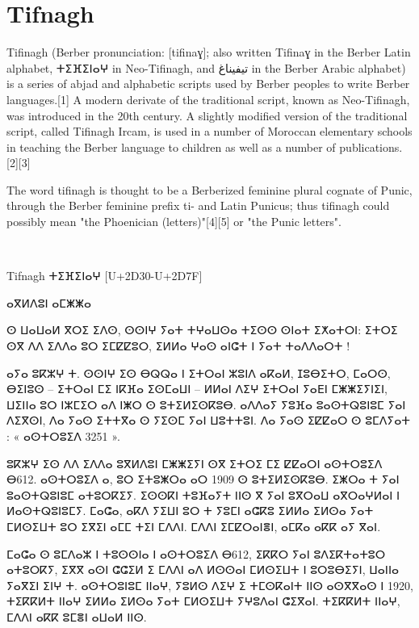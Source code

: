 \section{Tifnagh}

\newfontfamily{}

Tifinagh (Berber pronunciation: [tifinaɣ]; also written Tifinaɣ in the Berber Latin alphabet, {\tifinagh  ⵜⵉⴼⵉⵏⴰⵖ} in Neo-Tifinagh, and تيفيناغ in the Berber Arabic alphabet) is a series of abjad and alphabetic scripts used by Berber peoples to write Berber languages.[1]
A modern derivate of the traditional script, known as Neo-Tifinagh, was introduced in the 20th century. A slightly modified version of the traditional script, called Tifinagh Ircam, is used in a number of Moroccan elementary schools in teaching the Berber language to children as well as a number of publications.[2][3]

The word tifinagh is thought to be a Berberized feminine plural cognate of Punic, through the Berber feminine prefix ti- and Latin Punicus; thus tifinagh could possibly mean "the Phoenician (letters)"[4][5] or "the Punic letters".

\bgroup

\noindent\tifinagh
\colorbox{graphicbackground}{\color{black}^^A
\begin{minipage}{\textwidth}
\parindent1pt
\vskip10pt
 \rightskip\leftskip
Tifnagh     ⵜⵉⴼⵉⵏⴰⵖ [U+2D30-U+2D7F]

ⴰⴳⵍⴷⵓⵏ ⴰⵎⵥⵥⴰ

ⵙ ⵡⴰⵡⴰⵍ ⴳⵔⵉ ⵉⴷⵙ, ⵙⵙⵏⵖ ⵢⴰⵜ ⵜⵖⴰⵡⵙⴰ ⵜⵉⵙⵙ ⵙⵏⴰⵜ  ⵉⵅⴰⵜⵔⵏ: ⵉⵜⵔⵉ ⵙⴳ ⴷⴷ ⵉⴷⴷⴰ ⵓⵔ ⵉⵎⵇⵇⵓⵔ, ⵉⵍⵍⴰ ⵖⴰⵙ ⴰⵏⵛⵜ ⵏ ⵢⴰⵜ ⵜⴰⴷⴷⴰⵔⵜ !

ⴰⵢⴰ ⵓⴽⵣⵖ ⵜ. ⵙⵙⵏⵖ ⵉⵙ ⴱⵕⵕⴰ ⵏ ⵉⵜⵔⴰⵏ ⵣⵓⵏⴷ ⴰⴽⴰⵍ, ⵊⵓⴱⵉⵜⵔ, ⵎⴰⵔⵙ, ⴱⵉⵏⵓⵙ – ⵉⵜⵔⴰⵏ ⵎⵉ ⵏⴽⴼⴰ ⵉⵙⵎⴰⵡⵏ – ⵍⵍⴰⵏ ⴷⵉⵖ ⵉⵜⵔⴰⵏ ⵢⴰⴹⵏ ⵎⵥⵥⵉⵢⵏⵉⵏ, ⵡⵉⵏⵏⴰ ⵓⵔ ⵏⵣⵎⵉⵔ ⴰⴷ ⵏⵥⵔ ⵙ ⵓⵜⵉⵍⵉⵙⴽⵓⴱ. ⴰⴷⴷⴰⵢ ⵢⵓⴼⴰ ⵓⴰⵙⵜⵕⵓⵏⵓⵎ ⵢⴰⵏ ⴷⵉⴳⵙⵏ, ⴷⴰ ⵢⴰⵙ ⵉⵜⵜⴳⴰ ⵙ ⵢⵉⵙⵎ ⵢⴰⵏ ⵡⵓⵜⵜⵓⵏ. ⴷⴰ ⵢⴰⵙ ⵉⵇⵇⴰⵔ ⵙ ⵓⵎⴷⵢⴰⵜ : « ⴰⵙⵜⵔⵓⵉⴷ 3251 ».

ⵓⴽⵣⵖ ⵉⵙ ⴷⴷ ⵉⴷⴷⴰ ⵓⴳⵍⴷⵓⵏ ⵎⵥⵥⵉⵢⵏ ⵙⴳ ⵉⵜⵔⵉ ⵎⵉ ⵇⵇⴰⵔⵏ ⴰⵙⵜⵔⵓⵉⴷ ⴱ612. ⴰⵙⵜⵔⵓⵉⴷ ⴰ, ⵓⵔ ⵉⵜⵓⵥⵔⴰ ⴰⵔ 1909 ⵙ ⵓⵜⵉⵍⵉⵙⴽⵓⴱ. ⵉⵥⵔⴰ ⵜ ⵢⴰⵏ ⵓⴰⵙⵜⵕⵓⵏⵓⵎ ⴰⵜⵓⵔⴽⵉⵢ. ⵉⵙⵙⴽⵏ ⵜⵓⴼⴰⵢⵜ ⵏⵏⵙ ⴳ ⵢⴰⵏ ⵓⴳⵔⴰⵡ ⴰⴳⵔⴰⵖⵍⴰⵏ ⵏ ⵍⴰⵙⵜⵕⵓⵏⵓⵎⵢ. ⵎⴰⵛⴰ, ⴰⴽⴷ ⵢⵉⵡⵏ ⵓⵔ ⵜ ⵢⵓⵎⵏ ⴰⵛⴽⵓ ⵉⵍⵍⴰ ⵉⵍⵙⴰ ⵢⴰⵜ ⵎⵍⵙⵉⵡⵜ ⵓⵔ ⵉⴳⵉⵏ ⴰⵎⵎ ⵜⵉⵏ ⵎⴷⴷⵏ. ⵎⴷⴷⵏ ⵉⵎⵇⵔⴰⵏⴻⵏ, ⴰⵎⴽⴰ ⴰⴽⴽ ⴰⵢ ⴳⴰⵏ.

ⵎⴰⵛⴰ ⵙ ⵓⵎⴷⴰⵣ ⵏ ⵜⵓⵙⵙⵏⴰ ⵏ ⴰⵙⵜⵔⵓⵉⴷ ⴱ612, ⵉⴽⴽⵔ ⵢⴰⵏ ⵓⴷⵉⴽⵜⴰⵜⵓⵔ ⴰⵜⵓⵔⴽⵢ, ⵉⴳⴳ ⴰⵙⵏ ⵛⵛⵉⵍ ⵉ ⵎⴷⴷⵏ ⴰⴷ ⵍⵙⵙⴰⵏ ⵎⵍⵙⵉⵡⵜ ⵏ ⵓⵔⵓⴱⵉⵢⵏ, ⵡⴰⵏⵏⴰ ⵢⴰⴳⵉⵏ ⵉⵏⵖ ⵜ. ⴰⵙⵜⵔⵓⵏⵓⵎ ⵏⵏⴰⵖ, ⵢⵓⵍⵙ ⴷⵉⵖ ⵉ ⵜⵎⵙⴽⴰⵏⵜ ⵏⵏⵙ ⴰⵙⴳⴳⴰⵙ ⵏ 1920, ⵜⵉⴽⴽⵍⵜ ⵏⵏⴰⵖ ⵉⵍⵍⴰ ⵉⵍⵙⴰ ⵢⴰⵜ ⵎⵍⵙⵉⵡⵜ ⵢⵖⵓⴷⴰⵏ ⵛⵉⴳⴰⵏ. ⵜⵉⴽⴽⵍⵜ ⵏⵏⴰⵖ, ⵎⴷⴷⵏ ⴰⴽⴽ ⵓⵎⴻⵏ ⴰⵡⴰⵍ ⵏⵏⵙ.
\par
\vspace*{10pt}
\end{minipage}
}

